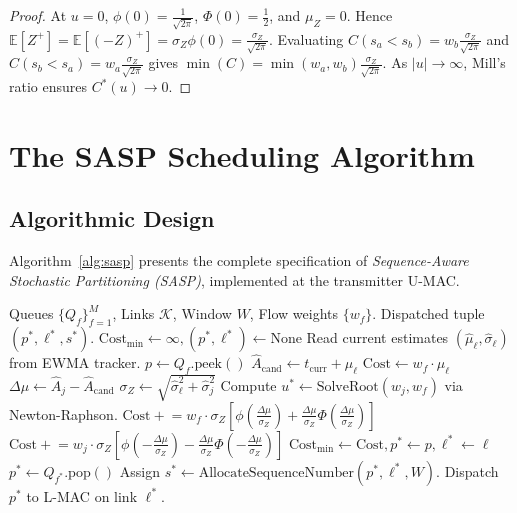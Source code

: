 \documentclass[10pt,journal,compsoc]{IEEEtran}
\begin{document}
\begin{proof}
At $u = 0$, $\phi(0) = \frac{1}{\sqrt{2\pi}}$, $\Phi(0) = \frac{1}{2}$, and $\mu_Z = 0$. Hence $\mathbb{E}[Z^+] = \mathbb{E}[(-Z)^+] = \sigma_Z \phi(0) = \frac{\sigma_Z}{\sqrt{2\pi}}$. Evaluating $C(s_a < s_b) = w_b \frac{\sigma_Z}{\sqrt{2\pi}}$ and $C(s_b < s_a) = w_a \frac{\sigma_Z}{\sqrt{2\pi}}$ gives $\min(C) = \min(w_a, w_b) \frac{\sigma_Z}{\sqrt{2\pi}}$. As $|u| \to \infty$, Mill's ratio ensures $C^*(u) \to 0$.
\end{proof}

\section{The SASP Scheduling Algorithm}
\label{sec:algorithm}

\subsection{Algorithmic Design}
Algorithm~\ref{alg:sasp} presents the complete specification of \emph{Sequence-Aware Stochastic Partitioning (SASP)}, implemented at the transmitter U-MAC.

\begin{algorithm}[t]
\caption{Sequence-Aware Stochastic Partitioning (SASP)}
\label{alg:sasp}
\begin{algorithmic}[1]
\REQUIRE Queues $\{Q_f\}_{f=1}^M$, Links $\mathcal{K}$, Window $W$, Flow weights $\{w_f\}$.
\ENSURE Dispatched tuple $(p^*, \ell^*, s^*)$.
\STATE $\text{Cost}_{\min} \leftarrow \infty, (p^*, \ell^*) \leftarrow \text{None}$
    \STATE Read current estimates $(\hat{\mu}_\ell, \hat{\sigma}_\ell)$ from EWMA tracker.
        \STATE $p \leftarrow Q_f.\text{peek}()$
        \STATE $\hat{A}_{\text{cand}} \leftarrow t_{\text{curr}} + \hat{\mu}_\ell$
        \STATE $\text{Cost} \leftarrow w_f \cdot \hat{\mu}_\ell$
            \STATE $\Delta\mu \leftarrow \hat{A}_j - \hat{A}_{\text{cand}}$
            \STATE $\sigma_Z \leftarrow \sqrt{\hat{\sigma}_\ell^2 + \hat{\sigma}_j^2}$
            \STATE Compute $u^* \leftarrow \text{SolveRoot}(w_j, w_f)$ via Newton-Raphson.
                \STATE $\text{Cost} \mathrel{+}= w_f \cdot \sigma_Z \left[ \phi(\frac{\Delta\mu}{\sigma_Z}) + \frac{\Delta\mu}{\sigma_Z} \Phi(\frac{\Delta\mu}{\sigma_Z}) \right]$
            \ELSE
                \STATE $\text{Cost} \mathrel{+}= w_j \cdot \sigma_Z \left[ \phi(-\frac{\Delta\mu}{\sigma_Z}) - \frac{\Delta\mu}{\sigma_Z} \Phi(-\frac{\Delta\mu}{\sigma_Z}) \right]$
            \ENDIF
        \ENDFOR
            \STATE $\text{Cost}_{\min} \leftarrow \text{Cost}, p^* \leftarrow p, \ell^* \leftarrow \ell$
        \ENDIF
    \ENDFOR
\ENDFOR
\STATE $p^* \leftarrow Q_{f^*}.\text{pop}()$
\STATE Assign $s^* \leftarrow \text{AllocateSequenceNumber}(p^*, \ell^*, W)$.
\STATE Dispatch $p^*$ to L-MAC on link $\ell^*$.
\end{algorithmic}
\end{algorithm}
\end{document}
